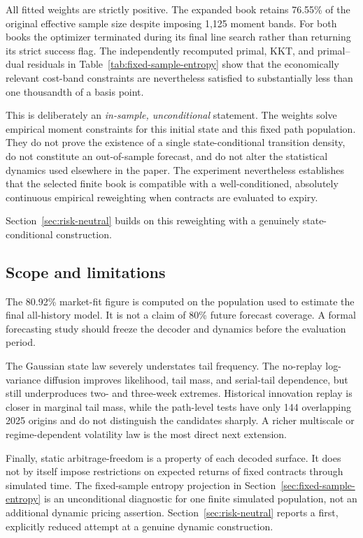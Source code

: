 \documentclass[11pt,a4paper]{article}
\begin{document}
All fitted weights are strictly positive.  The expanded book retains 76.55\%
of the original effective sample size despite imposing 1,125 moment bands.
For both books the optimizer terminated during its final line search rather
than returning its strict success flag.  The independently recomputed primal,
KKT, and primal--dual residuals in Table~\ref{tab:fixed-sample-entropy} show
that the economically relevant cost-band constraints are nevertheless
satisfied to substantially less than one thousandth of a basis point.

This is deliberately an \emph{in-sample, unconditional} statement.  The
weights solve empirical moment constraints for this initial state and this
fixed path population.  They do not prove the existence of a single
state-conditional transition density, do not constitute an out-of-sample
forecast, and do not alter the statistical dynamics used elsewhere in the
paper.  The experiment nevertheless establishes that the selected finite
book is compatible with a well-conditioned, absolutely continuous empirical
reweighting when contracts are evaluated to expiry.

Section~\ref{sec:risk-neutral} builds on this reweighting with a genuinely
state-conditional construction.

\subsection{Scope and limitations}

The 80.92\% market-fit figure is computed on the population used to estimate
the final all-history model.  It is not a claim of 80\% future forecast
coverage.  A formal forecasting study should freeze the decoder and dynamics
before the evaluation period.

The Gaussian state law severely understates tail frequency.  The no-replay
log-variance diffusion improves likelihood, tail mass, and serial-tail
dependence, but still underproduces two- and three-week extremes.  Historical
innovation replay is closer in marginal tail mass, while the path-level tests
have only 144 overlapping 2025 origins and do not distinguish the candidates
sharply.  A richer multiscale or regime-dependent volatility law is the most
direct next extension.

Finally, static arbitrage-freedom is a property of each decoded surface.  It
does not by itself impose restrictions on expected returns of fixed contracts
through simulated time.  The fixed-sample entropy projection in
Section~\ref{sec:fixed-sample-entropy} is an unconditional diagnostic for one
finite simulated population, not an additional dynamic pricing assertion.
Section~\ref{sec:risk-neutral} reports a first, explicitly reduced attempt at
a genuine dynamic construction.
\end{document}
